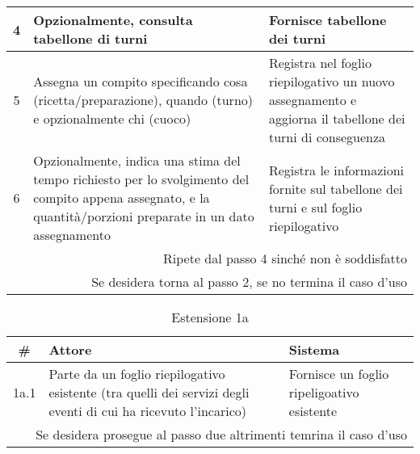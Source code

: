 \begin{table}[H]
\begin{tabular}{|c|p{7cm}|p{6.5cm}|}
        4                  & Opzionalmente, consulta tabellone di turni                                                                                                                    & Fornisce tabellone dei turni                                                                                                                                    \\\hline
        5                  & Assegna un compito specificando cosa (ricetta/preparazione), quando (turno) e opzionalmente chi (cuoco)                                                       & Registra nel foglio riepilogativo un nuovo assegnamento e aggiorna il tabellone dei turni di conseguenza                                                        \\\hline
        6                  & Opzionalmente, indica una stima del tempo richiesto per lo svolgimento del compito appena assegnato, e la quantità/porzioni preparate in un dato assegnamento & Registra le informazioni fornite sul tabellone dei turni e sul foglio riepilogativo                                                                             \\\hline
        \multicolumn{3}{|r|}{Ripete dal passo 4 sinché non è soddisfatto}                                                                                                                                                                                                                                                                                    \\
        \multicolumn{3}{|r|}{Se desidera torna al passo 2, se no termina il caso d’uso}                                                                                                                                                                                                                                                                      \\\hline
    \end{tabular}
\end{table}

\begin{table}[H]\centering\caption*{Estensione 1a}
    \small
    \begin{tabular}{|c|p{7cm}|p{6.23cm}|}
        \hline\bfseries \# & \bfseries Attore                                                                                               & \bfseries Sistema                          \\\hline
        1a.1               & Parte da un foglio riepilogativo esistente (tra quelli dei servizi degli eventi di cui ha ricevuto l’incarico) & Fornisce un foglio ripeligoativo esistente \\\hline
        \multicolumn{3}{|r|}{Se desidera prosegue al passo due altrimenti temrina il caso d'uso}                                                                                         \\\hline
    \end{tabular}
\end{table}

